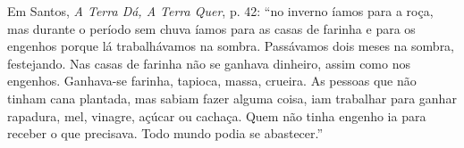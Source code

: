 Em Santos, \textit{A Terra Dá, A Terra Quer}, p. 42: \enquote{no inverno íamos para a roça, mas durante o período sem chuva íamos para as casas de farinha e para os engenhos porque lá trabalhávamos na sombra. Passávamos dois meses na sombra, festejando. Nas casas de farinha não se ganhava dinheiro, assim como nos engenhos. Ganhava-se farinha, tapioca, massa, crueira. As pessoas que não tinham cana plantada, mas sabiam fazer alguma coisa, iam trabalhar para ganhar rapadura, mel, vinagre, açúcar ou cachaça. Quem não tinha engenho ia para receber o que precisava. Todo mundo podia se abastecer.}